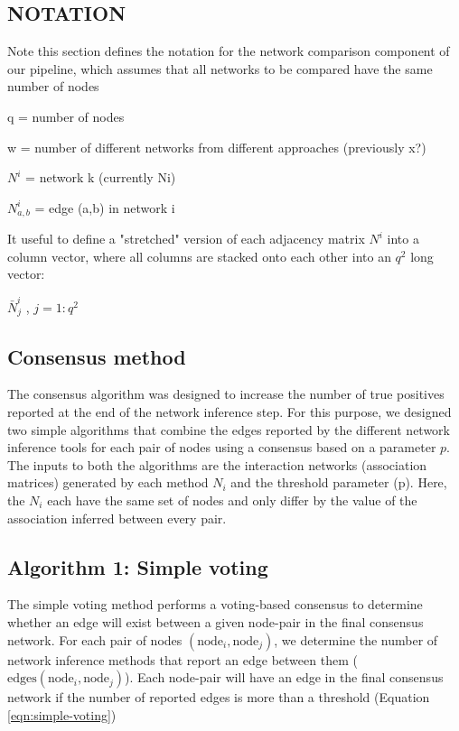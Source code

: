  \subsection*{NOTATION}

  Note this section defines the notation for the network comparison component of our pipeline, which assumes that all networks to be compared have the same number of nodes

  q = number of nodes

  w = number of different networks from different approaches (previously x?)

  $N^i$ = network k (currently Ni)

  $N^i_{a,b}$ = edge (a,b) in network i

  It useful to define a "stretched" version of each adjacency matrix $N^i$ into a column vector, where all columns are stacked onto each other into an $q^2$ long vector:

  $\bar{N}^i_{j}$ , $j=1:q^2$

  \subsection*{Consensus method}
  \vspace{-5mm}

  The consensus algorithm was designed to increase the number of true positives reported at the end of the network inference step. For this purpose, we designed two simple algorithms that combine the edges reported by the different network inference tools for each pair of nodes using a consensus based on a parameter \(p\). The inputs to both the algorithms are the interaction networks (association matrices) generated by each method \(N_{i}\) and the threshold parameter (p). Here, the \(N_{i}\) each have the same set of nodes and only differ by the value of the association inferred between every pair.

  \subsection*{Algorithm 1: Simple voting}
 

  The simple voting method performs a voting-based consensus to determine whether an edge will exist between a given node-pair in the final consensus network. For each pair of nodes \((\text{node}_{i}, \text{node}_{j})\), we determine the number of network inference methods that report an edge between them  (\(\text{edges}(\text{node}_{i}, \text{node}_{j})\)). Each node-pair will have an edge in the final consensus network if the number of reported edges is more than a threshold (Equation \ref{eqn:simple-voting})


